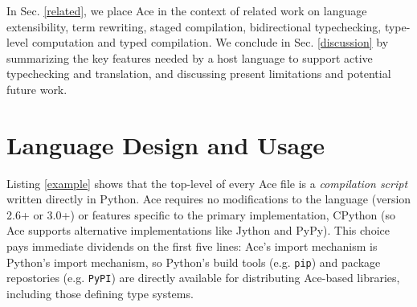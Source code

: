 \documentclass[10pt,preprint]{sigplanconf}
\begin{document}
In Sec.  \ref{related}, we place Ace in the context of related work on language extensibility, term rewriting, staged  compilation, bidirectional typechecking, type-level computation and typed compilation. We conclude in Sec. \ref{discussion} by summarizing the key features needed by a host language to support active typechecking and translation, and discussing present limitations and potential future work. %

\section{Language Design and Usage}\label{usage}


%
Listing \ref{example} shows that the top-level of every Ace file is a \emph{compilation script} written directly in Python. Ace requires no modifications to the language (version 2.6+ or 3.0+) or features specific to the primary implementation, CPython (so Ace supports alternative implementations like Jython and PyPy). This choice pays immediate dividends on the first five lines: Ace's import mechanism is Python's import mechanism, so Python's build tools (e.g. \verb|pip|) and package repostories (e.g. \verb|PyPI|) are directly available for distributing Ace-based libraries, including those defining type systems. %

\end{document}
